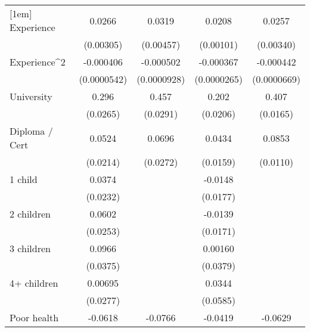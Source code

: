 {\begin{tabular}{l*{4}{c}}
[1em]
Experience          &      0.0266\sym{***}&      0.0319\sym{***}&      0.0208\sym{***}&      0.0257\sym{***}\\
                    &   (0.00305)         &   (0.00457)         &   (0.00101)         &   (0.00340)         \\
[1em]
Experience^{2}      &   -0.000406\sym{***}&   -0.000502\sym{***}&   -0.000367\sym{***}&   -0.000442\sym{***}\\
                    & (0.0000542)         & (0.0000928)         & (0.0000265)         & (0.0000669)         \\
[1em]
University          &       0.296\sym{***}&       0.457\sym{***}&       0.202\sym{***}&       0.407\sym{***}\\
                    &    (0.0265)         &    (0.0291)         &    (0.0206)         &    (0.0165)         \\
[1em]
Diploma / Cert      &      0.0524\sym{*}  &      0.0696\sym{*}  &      0.0434\sym{**} &      0.0853\sym{***}\\
                    &    (0.0214)         &    (0.0272)         &    (0.0159)         &    (0.0110)         \\
[1em]
1 child             &      0.0374         &                     &     -0.0148         &                     \\
                    &    (0.0232)         &                     &    (0.0177)         &                     \\
[1em]
2 children          &      0.0602\sym{*}  &                     &     -0.0139         &                     \\
                    &    (0.0253)         &                     &    (0.0171)         &                     \\
[1em]
3 children          &      0.0966\sym{*}  &                     &     0.00160         &                     \\
                    &    (0.0375)         &                     &    (0.0379)         &                     \\
[1em]
4+ children         &     0.00695         &                     &      0.0344         &                     \\
                    &    (0.0277)         &                     &    (0.0585)         &                     \\
[1em]
Poor health         &     -0.0618\sym{**} &     -0.0766\sym{***}&     -0.0419\sym{***}&     -0.0629\sym{***}\\

\end{tabular}}
